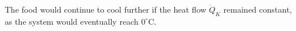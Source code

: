 The food would continue to cool further if the heat flow \( \dot{Q}_K \) remained constant, as the system would eventually reach \( 0^\circ\text{C} \).